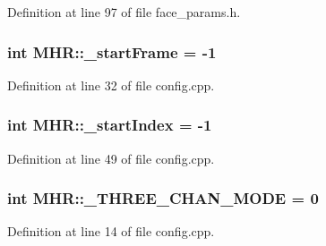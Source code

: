 Definition at line 97 of file face\+\_\+params.\+h.

\hypertarget{namespace_m_h_r_ad8b548e54d84866330d426d8edc8877e}{
\subsubsection[{\+\_\+start\+Frame}]{\setlength{\rightskip}{0pt plus 5cm}int M\+H\+R\+::\+\_\+start\+Frame = -\/1}}\label{namespace_m_h_r_ad8b548e54d84866330d426d8edc8877e}


Definition at line 32 of file config.\+cpp.

\hypertarget{namespace_m_h_r_a7650c1d1c25787e60c4dbbdb5cedf3b8}{
\subsubsection[{\+\_\+start\+Index}]{\setlength{\rightskip}{0pt plus 5cm}int M\+H\+R\+::\+\_\+start\+Index = -\/1}}\label{namespace_m_h_r_a7650c1d1c25787e60c4dbbdb5cedf3b8}


Definition at line 49 of file config.\+cpp.

\hypertarget{namespace_m_h_r_a100c1e31c0fbc8c8b292064c1a8da006}{
\subsubsection[{\+\_\+\+T\+H\+R\+E\+E\+\_\+\+C\+H\+A\+N\+\_\+\+M\+O\+D\+E}]{\setlength{\rightskip}{0pt plus 5cm}int M\+H\+R\+::\+\_\+\+T\+H\+R\+E\+E\+\_\+\+C\+H\+A\+N\+\_\+\+M\+O\+D\+E = 0}}\label{namespace_m_h_r_a100c1e31c0fbc8c8b292064c1a8da006}


Definition at line 14 of file config.\+cpp.

